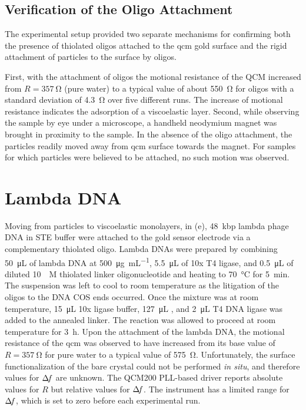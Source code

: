 \subsection{Verification of the Oligo Attachment}
The experimental setup provided two separate mechanisms for confirming both
the presence of thiolated oligos attached to the \gls{qcm} gold surface and the
rigid attachment of particles to the surface by oligos.

First, with the attachment of oligos the motional resistance of the QCM
increased from $R=\SI{357}{\ohm}$ (pure water) to a typical value of about
\SI{550}{\ohm} for oligos with a standard deviation of \SI{4.3}{\ohm} over
five different runs.  The increase of motional resistance indicates the
adsorption of a viscoelastic layer.  Second, while observing the sample by
eye under a microscope, a handheld neodymium magnet was brought in
proximity to the sample.  In the absence of the oligo attachment, the
particles readily moved away from \gls{qcm} surface towards the magnet.  For
samples for which particles were believed to be attached, no such motion
was observed.


\section{Lambda DNA}
Moving from particles to viscoelastic monolayers, in
(e), \SI{48}{kbp} lambda phage DNA in STE buffer were
attached to the gold sensor electrode via a complementary thiolated oligo.
Lambda DNAs were prepared by combining \SI{50}{\micro\liter} of lambda DNA
at \SI{500}{\micro\gram\per\milli\liter}, \SI{5.5}{\micro\liter} of 10x T4
ligase, and \SI{0.5}{\micro\liter} of diluted \SI{10}{\micro\textsc{M}}
thiolated linker oligonucleotide and heating to \SI{70}{\celsius} for
\SI{5}{\minute}.  The suspension was left to cool to room temperature as
the litigation of the oligos to the DNA COS ends occurred. Once the mixture
was at room temperature, \SI{15}{\micro\liter} 10x ligase buffer,
\SI{127}{\micro\liter} , and \SI{2}{\micro\liter} T4 DNA ligase was
added to the annealed linker.  The reaction was allowed to proceed at room
temperature for \SI{3}{\hour}.  Upon the attachment of the lambda DNA, the
motional resistance of the \gls{qcm} was observed to have increased from its base
value of $R=\SI{357}{\ohm}$ for pure water to a typical value of
\SI{575}{\ohm}.  Unfortunately, the surface functionalization of the bare
crystal could not be performed \textit{in situ}, and therefore values for
$\Delta\!f$ are unknown.  The QCM200 PLL-based driver reports absolute values for
$R$ but relative values for $\Delta\!f$.  The instrument has a limited range for
$\Delta\!f$, which is set to zero before each experimental run.

